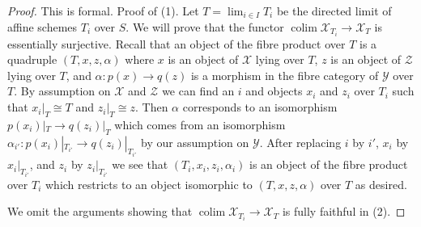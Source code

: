 \documentclass[10pt,a4paper]{amsart}
\theoremstyle{plain}
\theoremstyle{definition}
\theoremstyle{remark}
\numberwithin{equation}{subsection}
\def\lim{\mathop{\mathrm{lim}}\nolimits}
\def\colim{\mathop{\mathrm{colim}}\nolimits}
\begin{document}
\begin{proof}
This is formal. Proof of (1). Let $T = \lim_{i \in I} T_i$ be the directed
limit of affine schemes $T_i$ over $S$. We will prove that the functor
$\colim \mathcal{X}_{T_i} \to \mathcal{X}_T$ is essentially surjective.
Recall that an object of the fibre product over $T$ is a quadruple
$(T, x, z, \alpha)$ where $x$ is an object of $\mathcal{X}$ lying over $T$,
$z$ is an object of $\mathcal{Z}$ lying over $T$, and
$\alpha : p(x) \to q(z)$ is a morphism in the fibre category of
$\mathcal{Y}$ over $T$. By assumption on $\mathcal{X}$ and $\mathcal{Z}$
we can find an $i$ and objects $x_i$ and $z_i$ over $T_i$ such that
$x_i|_T \cong T$ and $z_i|_T \cong z$. Then $\alpha$ corresponds to
an isomorphism $p(x_i)|_T \to q(z_i)|_T$ which comes from an isomorphism
$\alpha_{i'} : p(x_i)|_{T_{i'}} \to q(z_i)|_{T_{i'}}$ by our assumption on
$\mathcal{Y}$. After replacing $i$ by $i'$, $x_i$ by $x_i|_{T_{i'}}$, and
$z_i$ by $z_i|_{T_{i'}}$ we see that $(T_i, x_i, z_i, \alpha_i)$
is an object of the fibre product over $T_i$ which restricts to
an object isomorphic to $(T, x, z, \alpha)$ over $T$ as desired.

\medskip\noindent
We omit the arguments showing that $\colim \mathcal{X}_{T_i} \to \mathcal{X}_T$
is fully faithful in (2).
\end{proof}
\end{document}
